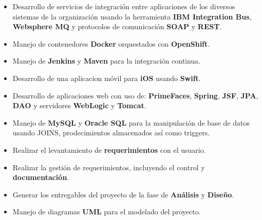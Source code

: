 \documentclass[letterpaper]{twentysecondcv} %
\begin{document}


\begin{itemize}
	\item Desarrollo de servicios de integración entre aplicaciones de los diversos sistemas de la organización usando la herramienta \textbf{IBM Integration Bus}, \textbf{Websphere MQ} y protocolos de comunicación \textbf{SOAP} y \textbf{REST}.
	\item Manejo de contenedores \textbf{Docker} orquestados con \textbf{OpenShift}.
	\item Manejo de \textbf{Jenkins} y \textbf{Maven} para la integración continua.
\end{itemize}

\divider

\begin{itemize}
	\item Desarrollo de una aplicacion móvil para \textbf{iOS} usando \textbf{Swift}.
	\item Desarrollo de aplicaciones web con uso de: \textbf{PrimeFaces}, \textbf{Spring}, \textbf{JSF}, \textbf{JPA}, \textbf{DAO}  y servidores \textbf{WebLogic} y \textbf{Tomcat}.
	\item Manejo de \textbf{MySQL} y \textbf{Oracle SQL} para la manipulación de base de datos usando JOINS, prodecimientos almacenados así como triggers.
\end{itemize}


\newpage %

\makeprofileSecond %

\begin{itemize}
	\item Realizar el levantamiento de \textbf{requerimientos} con el usuario.
	\item Realizar la gestión de requerimientos, incluyendo el control y \textbf{documentación}.
	\item Generar los entregables del proyecto de la fase de \textbf{Análisis} y \textbf{Diseño}.
	\item Manejo de diagramas \textbf{UML} para el modelado del proyecto.
\end{itemize}
\end{document}
